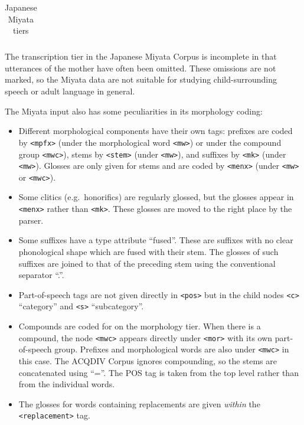 \documentclass[a4paper, 11pt]{book}
\begin{document}
\begin{table}[ht!]
\begin{tabular}{lll}
		\bottomrule
	\end{tabular}
	\caption{Japanese Miyata tiers}
	\label{tab:Japanese Miyata tiers}
\end{table}

The transcription tier in the Japanese Miyata Corpus is incomplete in that utterances of the mother have often been omitted. These omissions are not marked, so the Miyata data are not suitable for studying child-surrounding speech or adult language in general. 

The Miyata input also has some peculiarities in its morphology coding: 

\begin{itemize}
	\item Different morphological components have their own tags: prefixes are coded by \texttt{<mpfx>} (under the morphological word \texttt{<mw>}) or
		under the compound group \texttt{<mwc>}), stems by \texttt{<stem>} (under \texttt{<mw>}), and suffixes by \texttt{<mk>} (under \texttt{<mw>}). 
		Glosses are only given for stems and are coded by \texttt{<menx>} (under \texttt{<mw>} or \texttt{<mwc>}). 
	\item Some clitics (e.g.\ honorifics) are regularly glossed, but the glosses appear in \texttt{<menx>} rather than \texttt{<mk>}. These glosses
		are moved to the right place by the parser. 
	\item Some suffixes have a type attribute “fused”. These are suffixes with no clear phonological shape which are fused with their stem. 
		The glosses of such suffixes are joined to that of the preceding stem using the conventional separator “.”. 
	\item Part-of-speech tags are not given directly in \texttt{<pos>} but in the child nodes \texttt{<c>} “category” and \texttt{<s>} “subcategory”.
	\item Compounds are coded for on the morphology tier. When there is a compound, the node \texttt{<mwc>} appears directly under \texttt{<mor>}
		with its own part-of-speech group. Prefixes and morphological words are also under \texttt{<mwc>} in this case. 
		The ACQDIV Corpus ignores compounding, so the stems are concatenated using “=”. The POS tag is taken from the top level rather than from the 
		individual words. 
	\item The glosses for words containing replacements are given \emph{within} the \texttt{<replacement>} tag. 
\end{itemize}
\end{document}
